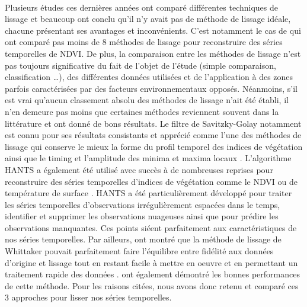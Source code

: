 \\Plusieurs études ces dernières années ont comparé différentes techniques de lissage \citep{Jonsson2002,Chen2004,Hird2009,Kandasamy2012,Geng2014,Shao2016,Liu2017} et beaucoup ont conclu qu'il n'y avait pas de méthode de lissage idéale, chacune présentant ses avantages et inconvénients. C'est notamment le cas de \citet{Geng2014} qui ont comparé pas moins de 8 méthodes de lissage pour reconstruire des séries temporelles de NDVI. De plus, la comparaison entre les méthodes de lissage n'est pas toujours significative du fait de l'objet de l'étude (simple comparaison, classification \ldots{}), des différentes données utilisées et de l'application à des zones parfois caractérisées par des facteurs environnementaux opposés. 
Néanmoins, s'il est vrai qu'aucun classement absolu des méthodes de lissage n'ait été établi, il n'en demeure pas moins que certaines méthodes reviennent souvent dans la littérature et ont donné de bons résultats. Le filtre de Savitzky-Golay notamment est connu pour ses résultats consistants \citep{Chen2004,Bojanowski2009,Kandasamy2012,Kim2014,Geng2014} et apprécié comme l'une des méthodes de lissage qui conserve le mieux la forme du profil temporel des indices de végétation ainsi que le timing et l'amplitude des minima et maxima locaux \citep{Geng2014}. L'algorithme HANTS a également été utilisé avec succès à de nombreuses reprises pour reconstruire des séries temporelles d'indices de végétation comme le NDVI ou de température de surface \citep{Roerink2000,Jakubauskas2001,Lunetta2006,Julien2006,Zhou2012,Zhou2015}. HANTS a été particulièrement développé pour traiter les séries temporelles d'observations irrégulièrement espacées dans le temps, identifier et supprimer les observations nuageuses \citep{Verhoef1996,Roerink2000} ainsi que pour prédire les observations manquantes. Ces points siéent parfaitement aux caractéristiques de nos séries temporelles. Par ailleurs, \citet{Atzberger2011} ont montré que la méthode de lissage de Whittaker pouvait parfaitement faire l'équilibre entre fidélité aux données d'origine et lissage tout en restant facile à mettre en oeuvre et en permettant un traitement rapide des données \citep{Eilers2003}. \citet{Atkinson2012,Geng2014,Shao2016} ont également démontré les bonnes performances de cette méthode. Pour les raisons citées, nous avons donc retenu et comparé ces 3 approches pour lisser nos séries temporelles.

